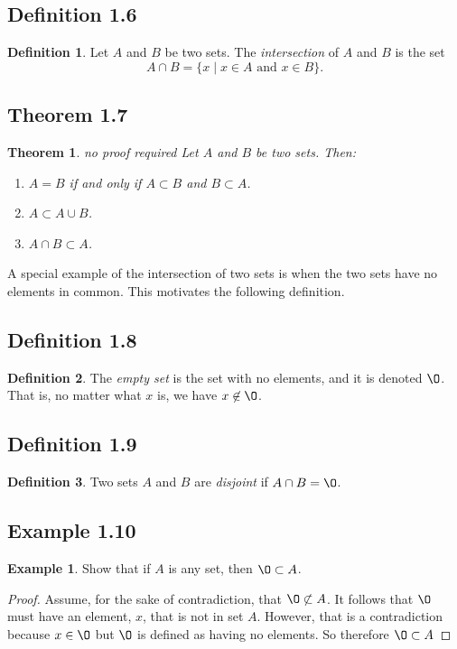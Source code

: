 \documentclass[openany, amssymb, psamsfonts]{amsart}
\renewcommand{\emptyset}{\O}
\newcommand{\meta}[1]{{\color{green} #1}} %
\newtheorem{thm}{Theorem}[section]
\theoremstyle{definition}
\newtheorem{defn}{Definition}[section]
\newtheorem{exmp}{Example}[section]
\numberwithin{equation}{section}
\begin{document}
\subsection{Definition 1.6}
\begin{defn}  Let $A$ and $B$ be two sets. 
The \emph{intersection} of $A$ and $B$ is the set
\[
A \cap B = \{ x \mid \text{$x \in A$ and $x \in B$} \}.
\]
\end{defn}
\subsection{Theorem 1.7}
\begin{thm} \label{basicsets} \meta{no proof required}
Let $A$ and $B$ be two sets.  Then:

\begin{enumerate}
\item[a)]
$A=B$ if and only if $A\subset B$ and $B\subset A$.
\item[b)]
$A\subset A\cup B$.

\item[c)]
$A\cap B\subset A$.
\end{enumerate}
\end{thm}

A special example of the intersection of two sets is when the two sets have no elements in common.
This motivates the following definition.
\subsection{Definition 1.8}
\begin{defn}  
The \emph{empty set} is the set with no elements, and it is denoted $\emptyset$.  That is,
no matter what $x$ is, we have $x\not\in \emptyset$.
\end{defn}  
\subsection{Definition 1.9}
\begin{defn}  
Two sets $A$ and $B$ are \emph{disjoint} if $A\cap B=\emptyset$.
\end{defn}  
\subsection{Example 1.10}
\begin{exmp}
     
Show that if $A$ is any set, then $\emptyset\subset A$. 
\begin{proof}Assume, for the sake of contradiction, that $\emptyset \not\subset A$. It follows that 
$\emptyset$ must have an element, $x$, that is not in set $A$. However, that is a contradiction because $x\in \emptyset$ but $\emptyset$ is defined as having no elements. So therefore $\emptyset \subset A$
\end{proof}
\end{exmp} 
\end{document}
